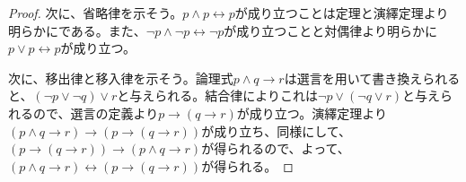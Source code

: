 \documentclass[a4paper]{jsarticle}
\begin{document}
\begin{proof}
次に、省略律を示そう。$p \land p \leftrightarrow p$が成り立つことは定理と演繹定理より明らかにである。また、$\neg p \land \neg p \leftrightarrow \neg p$が成り立つことと対偶律より明らかに$p \vee p \leftrightarrow p$が成り立つ。\par
次に、移出律と移入律を示そう。論理式$p \land q \rightarrow r$は選言を用いて書き換えられると、$(\neg p \vee \neg q) \vee r$と与えられる。結合律によりこれは$\neg p \vee (\neg q \vee r)$と与えられるので、選言の定義より$p \rightarrow (q \rightarrow r)$が成り立つ。演繹定理より$(p \land q \rightarrow r) \rightarrow \left( p \rightarrow (q \rightarrow r) \right)$が成り立ち、同様にして、$\left( p \rightarrow (q \rightarrow r) \right) \rightarrow (p \land q \rightarrow r)$が得られるので、よって、$(p \land q \rightarrow r) \leftrightarrow \left( p \rightarrow (q \rightarrow r) \right)$が得られる。\par

\end{proof}
\end{document}

